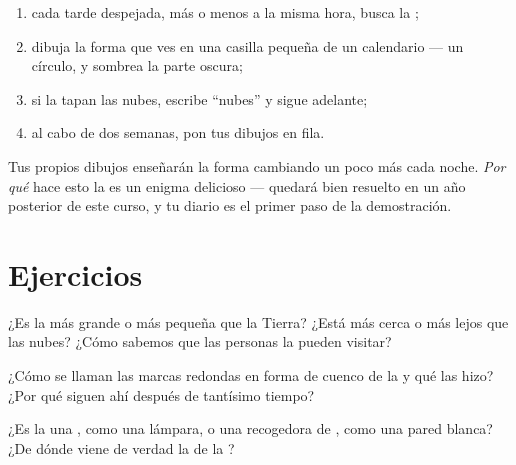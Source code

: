 \begin{method}\label{met:g2:moon-in-the-sky:diary}
\begin{enumerate}
  \item cada tarde despejada, más o menos a la misma hora, busca la
        ;
  \item dibuja la forma que ves en una casilla pequeña de un
        calendario --- un círculo, y sombrea la parte oscura;
  \item si la tapan las nubes, escribe ``nubes'' y sigue adelante;
  \item al cabo de dos semanas, pon tus dibujos en fila.
\end{enumerate}
Tus propios dibujos enseñarán la forma cambiando un poco más cada
noche. \emph{Por qué} hace esto la  es un enigma delicioso ---
quedará bien resuelto en un año posterior de este curso, y tu diario
es el primer paso de la demostración.
\end{method}

\section{Ejercicios}

\begin{exercise}[$\star$]\label{exo:g2:moon-in-the-sky:1}
¿Es la  más grande o más pequeña que la Tierra? ¿Está más cerca o
más lejos que las nubes? ¿Cómo sabemos que las personas la pueden
visitar?
\end{exercise}

\begin{exercise}[$\star$]\label{exo:g2:moon-in-the-sky:2}
¿Cómo se llaman las marcas redondas en forma de cuenco de la
 y qué las hizo? ¿Por qué siguen ahí después de tantísimo
tiempo?
\end{exercise}

\begin{exercise}[$\star$]\label{exo:g2:moon-in-the-sky:3}
¿Es la  una , como una lámpara, o una
recogedora de , como una pared blanca? ¿De dónde viene de verdad la
 de la ?
\end{exercise}

